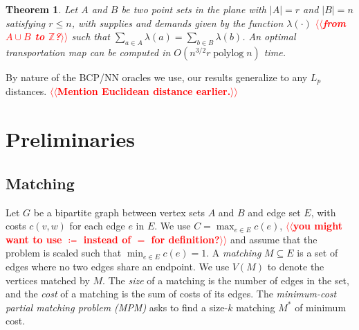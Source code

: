 \documentclass[11pt]{article}
\makeatletter
\def\polylog{\mathop{\mathrm{polylog}}}
\def\tsupply{\lambda}
\theoremstyle{plain}
\newtheorem{theorem}{Theorem}
\def\n@te#1{\textsf{\boldmath \textbf{$\langle\!\langle$#1$\rangle\!\rangle$}}\leavevmode}
\def\note#1{\textcolor{red}{\n@te{#1}}}
\makeatother
\begin{document}
\begin{theorem}
\label{theorem:orlin}
Let $A$ and $B$ be two point sets in the plane with $|A| = r$ and $|B| = n$ satisfying $r \le n$, with
supplies and demands given by the function $\tsupply(\cdot)$ \note{from $A\cup B$ to $\mathbb{Z}$?} such that
$\sum_{a \in A} \tsupply(a) = \sum_{b \in B} \tsupply(b)$.
An optimal transportation map can be computed in $O(n^{3/2}r\polylog n)$ time.
\end{theorem}



By nature of the BCP/NN oracles we use, our results generalize to any $L_p$ distances. \note{Mention Euclidean distance earlier.}


\section{Preliminaries}
\label{section:prelim}

\subsection{Matching}

Let $G$ be a bipartite graph between vertex sets $A$ and $B$ and edge set $E$,
with costs $c(v, w)$ for each edge $e$ in $E$.
We use $C = \max_{e \in E} c(e)$, \note{you might want to use $\coloneqq$ instead of $=$ for definition?} and assume that the problem is scaled such
that $\min_{e \in E} c(e) = 1$.
A \emph{matching} $M \subseteq E$ is a set of edges where no two edges share an
endpoint.
We use $V(M)$ to denote the vertices matched by $M$.
The \emph{size} of a matching is the number of edges in the set, and the \emph{cost} of a
matching is the sum of costs of its edges.
The \emph{minimum-cost partial matching problem (MPM)} asks to find a size-$k$
matching $M^*$ of minimum cost.
\end{document}
